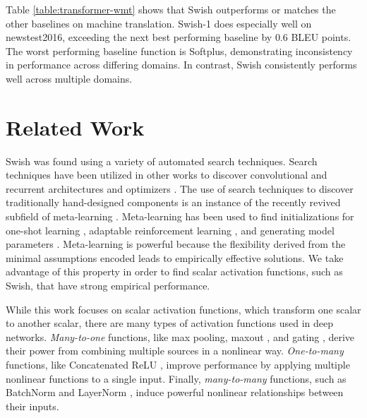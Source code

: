 \documentclass{article} %
\begin{document}
Table \ref{table:transformer-wmt} shows that Swish outperforms or matches the other baselines on machine translation. Swish-1 does especially well on newstest2016, exceeding the next best performing baseline by $0.6$ BLEU points. The worst performing baseline function is Softplus, demonstrating inconsistency in performance across differing domains. In contrast, Swish consistently performs well across multiple domains.  


\section{Related Work}
\label{sec:related-work}

Swish was found using a variety of automated search techniques. Search techniques have been utilized in other works to discover convolutional and recurrent architectures \citep{zoph2016neural,zoph2017learning,real2017large,cai2017reinforcement,zhong2017practical} and optimizers \citep{bello2017neural}. The use of search techniques to discover traditionally hand-designed components is an instance of the recently revived subfield of meta-learning \citep{schmidhuber1987evolutionary,naik1992meta,thrun2012learning}. Meta-learning has been used to find initializations for one-shot learning \citep{finn2017model,ravi2016optimization}, adaptable reinforcement learning \citep{wang2016learning,duan2016rl}, and generating model parameters \citep{ha2016hypernetworks}. Meta-learning is powerful because the flexibility derived from the minimal assumptions encoded leads to empirically effective solutions. We take advantage of this property in order to find scalar activation functions, such as Swish, that have strong empirical performance. 

While this work focuses on scalar activation functions, which transform one scalar to another scalar, there are many types of activation functions used in deep networks. \emph{Many-to-one} functions, like max pooling, maxout \citep{goodfellow2013maxout}, and gating \citep{hochreiter1997long,srivastava2015highway, van2016conditional,dauphin2016language,wu2016multiplicative,miech2017learnable}, derive their power from combining multiple sources in a nonlinear way. \emph{One-to-many} functions, like Concatenated ReLU \citep{shang2016understanding}, improve performance by applying multiple nonlinear functions to a single input. Finally, \emph{many-to-many} functions, such as BatchNorm \citep{ioffe2015batch} and LayerNorm \citep{ba2016layer}, induce powerful nonlinear relationships between their inputs.
\end{document}
